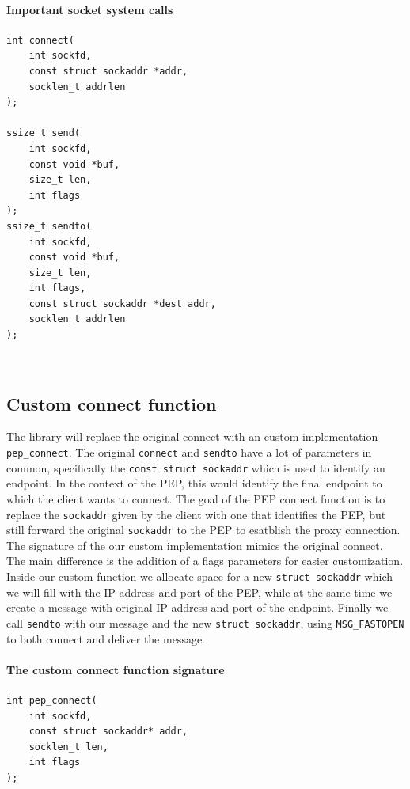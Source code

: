 \documentclass[a4paper,english, 11pt]{report}
\begin{document}
\noindent\begin{minipage}{\linewidth}
\paragraph{Important socket system calls}
\begin{verbatim}
int connect(
    int sockfd,
    const struct sockaddr *addr,
    socklen_t addrlen
);

ssize_t send(
    int sockfd,
    const void *buf,
    size_t len,
    int flags
);
ssize_t sendto(
    int sockfd,
    const void *buf,
    size_t len,
    int flags,
    const struct sockaddr *dest_addr,
    socklen_t addrlen
);
\end{verbatim}
\end{minipage}\\


\subsection{Custom connect function}
The library will replace the original connect with an custom implementation \verb|pep_connect|. The original \verb|connect| and \verb|sendto| have a lot of parameters in common, specifically the \verb|const struct sockaddr| which is used to identify an endpoint. In the context of the PEP, this would identify the final endpoint to which the client wants to connect. The goal of the PEP connect function is to replace the \verb|sockaddr| given by the client with one that identifies the PEP, but still forward the original \verb|sockaddr| to the PEP to esatblish the proxy connection.\\

The signature of the our custom implementation mimics the original connect. The main difference is the addition of a flags parameters for easier customization. Inside our custom function we allocate space for a new \verb|struct sockaddr| which we will fill with the IP address and port of the PEP, while at the same time we create a message with original IP address and port of the endpoint. Finally we call \verb|sendto| with our message and the new \verb|struct sockaddr|, using \verb|MSG_FASTOPEN| to both connect and deliver the message.\\

\noindent\begin{minipage}{\linewidth}
\paragraph{The custom connect function signature}
\begin{verbatim}
int pep_connect(
    int sockfd,
    const struct sockaddr* addr,
    socklen_t len,
    int flags
);
\end{verbatim}
\end{minipage}
\end{document}
